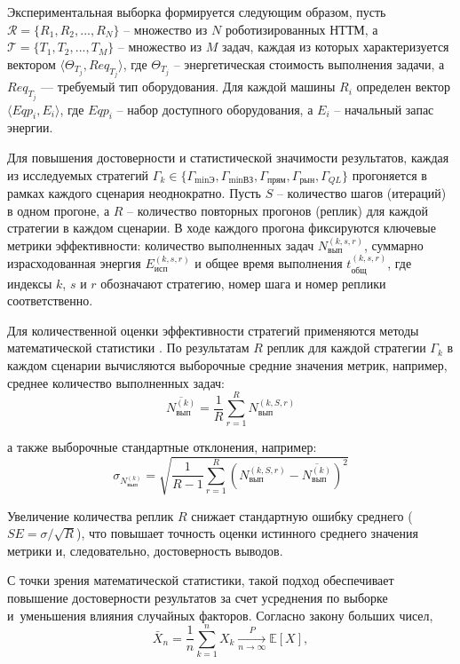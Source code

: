 Экспериментальная выборка формируется следующим образом, пусть $\mathcal{R} = \{R_1, R_2, ..., R_N\}$ -- множество из $N$ роботизированных НТТМ, а $\mathcal{T} = \{T_1, T_2, ..., T_M\}$ -- множество из $M$ задач, каждая из которых характеризуется вектором $\langle \Theta_{T_j}, Req_{T_j} \rangle$, где $\Theta_{T_j}$ -- энергетическая стоимость выполнения задачи, а~$Req_{T_j}$ — требуемый тип оборудования. Для каждой машины $R_i$ определен вектор $\langle Eqp_i, E_i \rangle$, где $Eqp_i$ -- набор доступного оборудования, а $E_i$ -- начальный запас энергии.

Для повышения достоверности и статистической значимости результатов, каждая из исследуемых стратегий $\Gamma_k \in \{\Gamma_{\min\text{Э}}, \Gamma_{\min\text{ВЗ}}, \Gamma_{\text{прям}}, \Gamma_{\text{рын}}, \Gamma_{QL}\}$ прогоняется в рамках каждого сценария неоднократно. Пусть $S$ -- количество шагов (итераций) в одном прогоне, а $R$ -- количество повторных прогонов (реплик) для каждой стратегии в каждом сценарии. В ходе каждого прогона фиксируются ключевые метрики эффективности: количество выполненных задач $N_{\text{вып}}^{(k, s, r)}$, суммарно израсходованная энергия $E_{\text{исп}}^{(k, s, r)}$ и общее время выполнения $t_{\text{общ}}^{(k, s, r)}$, где индексы $k$, $s$ и $r$ обозначают стратегию, номер шага и номер реплики соответственно.

Для количественной оценки эффективности стратегий применяются методы математической статистики \cite{Kulikov2008, Shpigelhalter2021}. По результатам $R$ реплик для каждой стратегии $\Gamma_k$ в каждом сценарии вычисляются выборочные средние значения метрик, например, среднее количество выполненных задач:
\begin{equation}
\overline{N_{вып}^{(k)}} = \frac{1}{R} \sum_{r=1}^{R} N_{вып}^{(k, S, r)}
\end{equation}

а также выборочные стандартные отклонения, например:
\begin{equation}
\sigma_{N_{вып}^{(k)}} = \sqrt{\frac{1}{R-1} \sum_{r=1}^{R} \left( N_{вып}^{(k, S, r)} - \overline{N_{вып}^{(k)}} \right)^2 }
\end{equation}

Увеличение количества реплик $R$ снижает стандартную ошибку среднего ($SE = \sigma / \sqrt{R}$), что повышает точность оценки истинного среднего значения метрики и, следовательно, достоверность выводов.

С точки зрения математической статистики, такой подход обеспечивает повышение достоверности результатов за счет усреднения по выборке и~уменьшения влияния случайных факторов. Согласно закону больших чисел,
\begin{equation}
	\bar{X}_n = \frac{1}{n}\sum_{k=1}^n X_k \xrightarrow[n \to \infty]{P} \mathbb{E}[X],
\end{equation}

